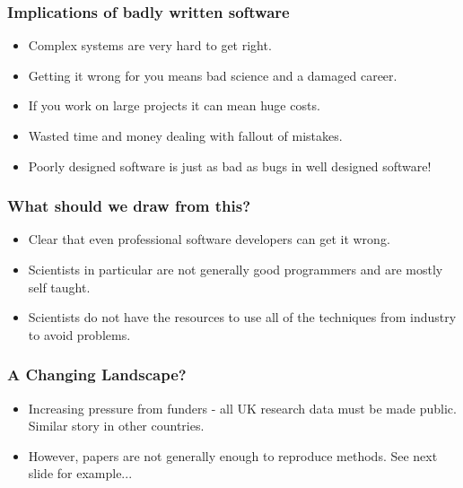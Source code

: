 \documentclass{beamer}
\begin{document}
\begin{frame}
    \frametitle{Implications of badly written software}
    \begin{itemize}
    \item Complex systems are very hard to get right.
    \item Getting it wrong for you means bad science and a damaged career.
    \item If you work on large projects it can mean huge costs.
    \item Wasted time and money dealing with fallout of mistakes.
    \item Poorly designed software is just as bad as bugs in well designed software!
    \end{itemize}
\end{frame}

\begin{frame}
    \frametitle{What should we draw from this?}
    \begin{itemize}
        \item Clear that even professional software developers can get it wrong.
        \item Scientists in particular are not generally good programmers and are mostly self taught.
        \item Scientists do not have the resources to use all of the techniques from industry to avoid problems.
    \end{itemize}
\end{frame}

\begin{frame}
    \frametitle{A Changing Landscape?}
    \begin{itemize}
        \item Increasing pressure from funders - all UK research data must be made public. Similar story in other countries.
        \item However, papers are not generally enough to reproduce methods. See next slide for example...
    \end{itemize}
\end{frame}
\end{document}
